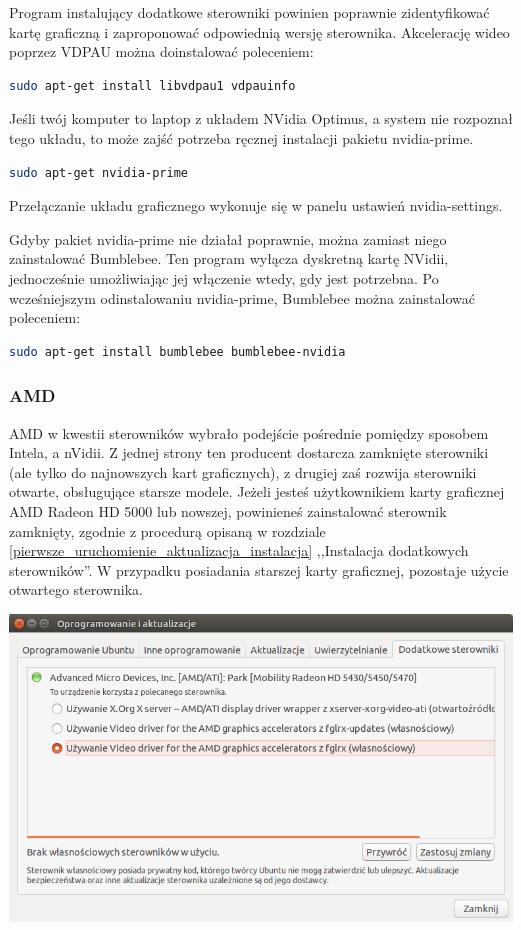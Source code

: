 Program instalujący dodatkowe sterowniki powinien poprawnie zidentyfikować kartę graficzną i zaproponować odpowiednią wersję sterownika.
Akcelerację wideo poprzez VDPAU można doinstalować poleceniem:

\begin{lstlisting}[language=bash]
sudo apt-get install libvdpau1 vdpauinfo
\end{lstlisting}

Jeśli twój komputer to laptop z układem NVidia Optimus, a system nie rozpoznał tego układu, to może zajść potrzeba ręcznej instalacji pakietu nvidia-prime. 

\begin{lstlisting}[language=bash]
sudo apt-get nvidia-prime
\end{lstlisting}

\noindent Przełączanie układu graficznego wykonuje się w panelu ustawień \textcolor{ubuntu_orange}{nvidia-settings}.

Gdyby pakiet nvidia-prime nie działał poprawnie, można zamiast niego zainstalować Bumblebee. Ten program wyłącza dyskretną kartę NVidii, jednocześnie umożliwiając jej włączenie wtedy, gdy jest potrzebna.
Po wcześniejszym odinstalowaniu nvidia-prime, Bumblebee można zainstalować poleceniem:

\begin{lstlisting}[language=bash]
sudo apt-get install bumblebee bumblebee-nvidia
\end{lstlisting}

\subsubsection{AMD}
AMD w kwestii sterowników wybrało podejście pośrednie pomiędzy sposobem Intela, a nVidii. Z jednej strony ten producent dostarcza zamknięte sterowniki (ale tylko do najnowszych kart graficznych), z drugiej zaś rozwija sterowniki otwarte, obsługujące starsze modele. Jeżeli jesteś użytkownikiem karty graficznej AMD Radeon HD 5000 lub nowszej, powinieneś zainstalować sterownik zamknięty, zgodnie z procedurą opisaną w rozdziale \ref{pierwsze_uruchomienie_aktualizacja_instalacja} ,,Instalacja dodatkowych sterowników''. W przypadku posiadania starszej karty graficznej, pozostaje użycie otwartego sterownika.

\begin{center}
	\includegraphics[width=\linewidth]{images/sterowniki_AMD.png}
\end{center}

